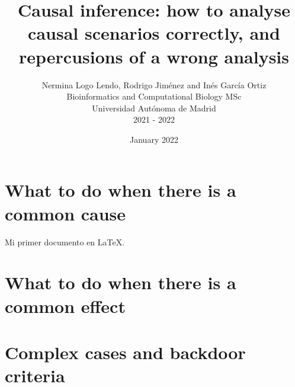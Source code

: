 \documentclass{article}
\title{Causal inference: how to analyse causal scenarios correctly, and repercusions of a wrong analysis}
\author{Nermina Logo Lendo, Rodrigo Jiménez and Inés García Ortiz\\
      Bioinformatics and Computational Biology MSc\\
      Universidad Autónoma de Madrid\\
      2021 - 2022}
\date{January 2022}
\begin{document}
\maketitle


\section*{What to do when there is a common cause}
Mi primer documento en \LaTeX{}.


\section*{What to do when there is a common effect}


\section*{Complex cases and backdoor criteria}
\end{document}

